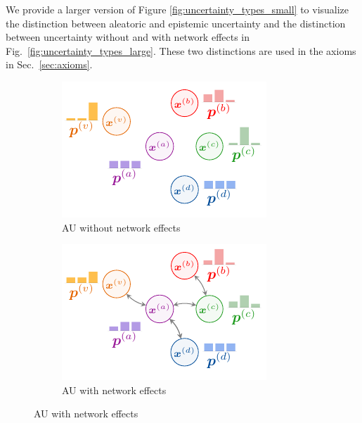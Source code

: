 We provide a larger version of Figure \ref{fig:uncertainty_types_small} to visualize the distinction between aleatoric and epistemic uncertainty and the distinction between uncertainty without and with network effects in Fig.~\ref{fig:uncertainty_types_large}. These two distinctions are used in the axioms in Sec.~\ref{sec:axioms}.

\begin{figure}[!h]
\centering
	\begin{subfigure}[t]{0.495\textwidth}
	    \centering
		\includegraphics[width=\textwidth]{resources/no-network-aleatoric.pdf}
		\caption{AU without network effects} 
		\label{subfig:au_without_network_large}
	\end{subfigure}
	\begin{subfigure}[t]{0.495\textwidth}
	    \centering
		\includegraphics[width=\textwidth]{resources/network-aleatoric.pdf}
		\caption{AU with network effects} 

\end{subfigure}
\end{figure}
